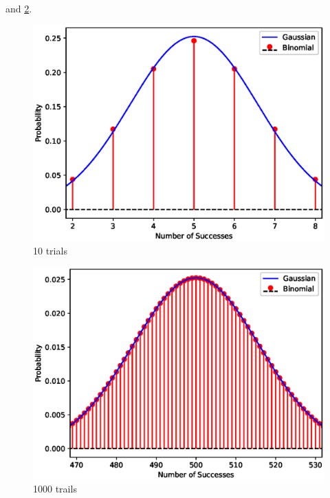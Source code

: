 \begin{enumerate}[label=\thechapter.\arabic*,ref=\thechapter.\theenumi]
  and
  \ref{fig:ncert/12/13/6/4/2}.
\begin{figure}[h]
  \includegraphics[width=\columnwidth]{ncert/12/13/6/4/figs/10.eps}
  \caption{10 trials}
  \label{fig:ncert/12/13/6/4/1}
\end{figure}
\begin{figure}[h]
  \includegraphics[width=\columnwidth]{ncert/12/13/6/4/figs/1000.eps}
  \caption{1000 trails}
  \label{fig:ncert/12/13/6/4/2}
\end{figure}
\end{enumerate}
